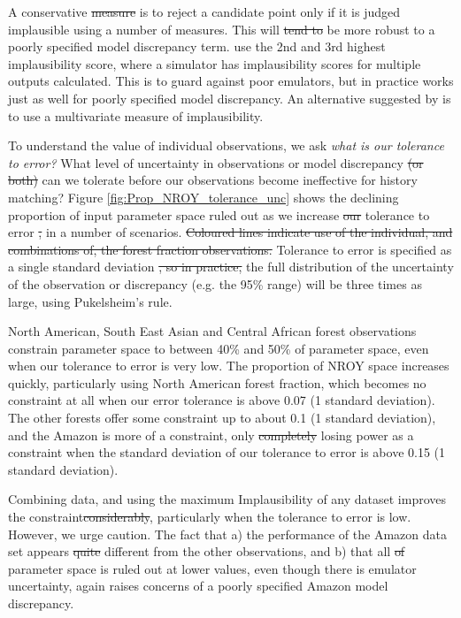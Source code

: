 \documentclass[esd, article]{copernicus} %
\providecommand{\DIFadd}[1]{{\protect\color{blue}\uwave{#1}}} %
\providecommand{\DIFdel}[1]{{\protect\color{red}\sout{#1}}}                      %
\providecommand{\DIFaddbegin}{} %
\providecommand{\DIFaddend}{} %
\providecommand{\DIFdelbegin}{} %
\providecommand{\DIFdelend}{} %
\begin{document}
A conservative \DIFdelbegin \DIFdel{measure }\DIFdelend \DIFaddbegin \DIFadd{approach }\DIFaddend is to reject a candidate point only if it is judged implausible using a number of measures. This will \DIFdelbegin \DIFdel{tend to }\DIFdelend be more robust to a poorly specified model discrepancy term. \cite{vernon2010galaxy} use the 2nd and 3rd highest implausibility score, where a simulator has implausibility scores for multiple outputs calculated. This is to guard against poor emulators, but in practice works just as well for poorly specified model discrepancy. An alternative suggested by \cite{vernon2010galaxy} is to use a multivariate measure of implausibility.

To understand the value of individual observations, we ask \emph{what is our tolerance to error?} What level of uncertainty in observations or model discrepancy  \DIFdelbegin \DIFdel{(or both) }\DIFdelend can we tolerate before our observations become ineffective for history matching? Figure \ref{fig:Prop_NROY_tolerance_unc} shows the declining proportion of input parameter space ruled out as we increase \DIFdelbegin \DIFdel{our }\DIFdelend tolerance to error \DIFdelbegin \DIFdel{, }\DIFdelend in a number of scenarios. \DIFdelbegin \DIFdel{Coloured lines indicate use of the individual, and combinations of, the forest fraction observations. }\DIFdelend Tolerance to error is specified as a single standard deviation \DIFdelbegin \DIFdel{, so in practice, }\DIFdelend \DIFaddbegin \DIFadd{so }\DIFaddend the full distribution of the uncertainty of the observation or discrepancy (e.g. the 95\% range) will be \DIFaddbegin \DIFadd{at leat }\DIFaddend three times as large, using Pukelsheim's rule.

North American, South East Asian and Central African forest observations constrain parameter space to between 40\% and 50\% of parameter space, even when our tolerance to error is very low. The proportion of NROY space increases quickly, particularly using North American forest fraction, which becomes no constraint at all when our error tolerance is above 0.07 (1 standard deviation). The other forests offer some constraint up to about 0.1 (1 standard deviation), and the Amazon is more of a constraint, only \DIFdelbegin \DIFdel{completely }\DIFdelend losing power as a constraint when the standard deviation of our tolerance to error is above 0.15 (1 standard deviation).

Combining data, and using the maximum Implausibility of any dataset improves the constraint\DIFdelbegin \DIFdel{considerably}\DIFdelend , particularly when the tolerance to error is low. However, we urge caution. The fact that a) the performance of the Amazon data set appears \DIFdelbegin \DIFdel{quite }\DIFdelend different from the other observations, and b) that all \DIFdelbegin \DIFdel{of }\DIFdelend parameter space is ruled out at lower values, even though there is emulator uncertainty, again raises concerns of a poorly specified Amazon model discrepancy. 
\end{document}
